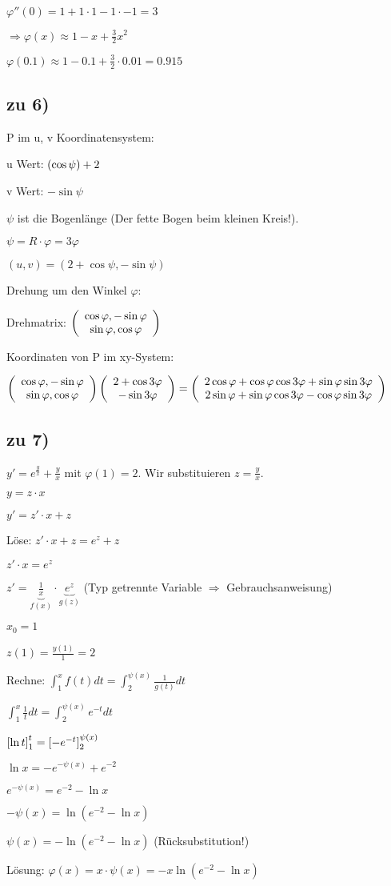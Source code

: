 $ \varphi''(0) = 1 + 1 \cdot 1 - 1 \cdot - 1 = 3$

$\Rightarrow \varphi(x) \approx 1 - x + \frac{3}{2} x^2 $

$ \varphi(0.1) \approx 1 - 0.1 + \frac{3}{2} \cdot 0.01 = 0.915 $

\subsection{zu 6)}
P im u, v Koordinatensystem: 

u Wert: $ \left( \cos \psi \right)  + 2$ 

v Wert: $ - \sin \psi$

$\psi$ ist die Bogenlänge (Der fette Bogen beim kleinen Kreis!).

$\psi = R \cdot \varphi = 3 \varphi$

$(u,v) = (2 + \cos \psi, -\sin \psi)$

Drehung um den Winkel $\varphi$: 

Drehmatrix: $  \left(  \begin{array}{c} \cos \varphi, -\sin \varphi\\\sin \varphi, \cos \varphi \end{array}  \right)  $

Koordinaten von P im xy-System:
 
$   \left(  \begin{array}{c} \cos \varphi, -\sin \varphi\\\sin \varphi, \cos \varphi \end{array}  \right)     \left(  \begin{array}{c} 2 + \cos 3 \varphi\\-\sin 3\varphi \end{array}  \right)  
=   \left(  \begin{array}{c} 2\cos \varphi + \cos \varphi \cos 3 \varphi + \sin \varphi \sin 3 \varphi\\2\sin \varphi + \sin \varphi \cos 3 \varphi - \cos \varphi \sin 3 \varphi \end{array}  \right)  
$

\subsection{zu 7)}
$y' = e^{\frac{y}{x}} + \frac{y}{x}$ mit $\varphi(1) = 2$. Wir substituieren $z = \frac{y}{x}$. 

$y = z \cdot x$

$y' = z' \cdot x + z $

Löse: $z' \cdot x + z = e^z + z$

$z'\cdot x = e^z$

$z' = \underbrace{\frac{1}{x}}_{f(x)} \cdot \underbrace{e^z}_{g(z)}$ (Typ getrennte Variable $\Rightarrow$ Gebrauchsanweisung)

$x_0 = 1$

$z(1)= \frac{y(1)}{1} = 2$

Rechne: 
$ \int_{1}^{x} f(t) dt = \int_{2}^{\psi(x)} \frac{1}{g(t)} dt $

$ \int_{1}^{x} \frac{1}{t} dt = \int_{2}^{\psi(x)} e^{-t} dt$

$  \left[ \ln t \right] _1^t =  \left[ -e^{-t} \right] _2^{\psi(x)} $

$ \ln x = -e^{-\psi(x)} + e^{-2} $

$ e^{-\psi(x)} = e^{-2} - \ln x $

$ -\psi(x) = \ln(e^{-2} - \ln x) $

$ \psi(x) = -\ln(e^{-2} - \ln x) $ (Rücksubstitution!)

Lösung:
$ \varphi(x) = x \cdot \psi(x) = - x \ln(e^{-2} - \ln x)$
